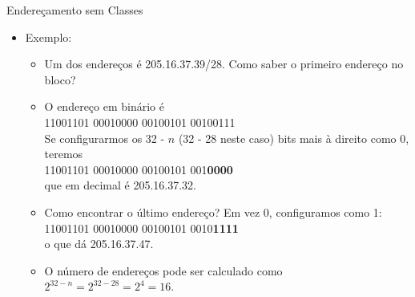 \documentclass{libs/ufc_format}
\begin{document}
\begin{frame}{Endereçamento sem Classes}
    \begin{itemize}
        \item Exemplo:
            \begin{itemize}
                \justifying
                \item Um dos endereços é 205.16.37.39/28. Como saber o primeiro endereço no bloco?
                \item O endereço em binário é\\ 
                \vspace{0.1 cm}
                11001101 00010000 00100101 00100111\\ 
                \vspace{0.1 cm}
                Se configurarmos os 32 - $n$ (32 - 28 neste caso) bits mais à direito como 0, teremos\\
                \vspace{0.1 cm}
                11001101 00010000 00100101 001\textbf{0000}\\ 
                \vspace{0.1 cm}
                que em decimal é 205.16.37.32.
                \item Como encontrar o último endereço? Em vez 0, configuramos como 1:\\ 
                \vspace{0.1 cm}
                11001101 00010000 00100101 0010\textbf{1111}\\ 
                \vspace{0.1 cm}
                o que dá 205.16.37.47.
                \item O número de endereços pode ser calculado como $2^{32 - n} = 2^{32 - 28} = 2^{4} = 16$.
            \end{itemize}
    \end{itemize}
\end{frame}
\end{document}
